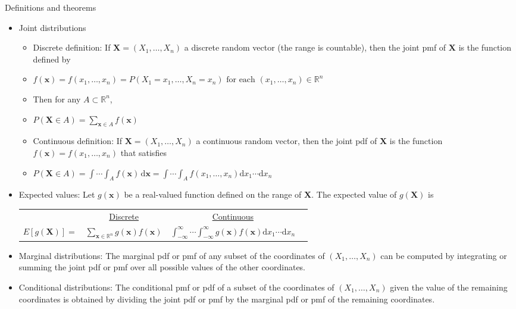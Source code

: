\documentclass{article}
\newcommand{\integral}[4]{\displaystyle \int_{#1}^{#2} #3 \,\mathrm{d} #4}		%
\newcommand{\vecn}[2]{#1_1, \ldots, #1_{#2}}	%
\begin{document}
Definitions and theorems
\begin{itemize}
    \item Joint distributions
    \begin{itemize}
        \item Discrete definition: If $\mathbf{X} = (\vecn{X}{n})$ a discrete random vector (the range is countable), then the joint pmf of $\mathbf{X}$ is the function defined by
        \item[] $f(\mathbf{x}) = f(\vecn{x}{n}) = P(X_1 = x_1, \ldots, X_n = x_n) \text{ for each } (\vecn{x}{n}) \in \mathbb{R}^n$
        \item[] Then for any $A \subset \mathbb{R}^n$,
        \item[] $\displaystyle P(\mathbf{X} \in A) = \sum_{\mathbf{x} \in A} f(\mathbf{x})$
        \item Continuous definition: If $\mathbf{X} = (\vecn{X}{n})$ a continuous random vector, then the joint pdf of $\mathbf{X}$ is the function $f(\mathbf{x}) = f(\vecn{x}{n})$ that satisfies
        \item[] $P(\mathbf{X} \in A) = \int \cdots \integral{A}{}{f(\mathbf{x})}{\mathbf{x}} = \int \cdots \int_A f(\vecn{x}{n}) \mathrm{d}x_1\cdots \mathrm{d}x_n$
    \end{itemize}
    \item Expected values: Let $g(\mathbf{x})$ be a real-valued function defined on the range of $\mathbf{X}$. The expected value of $g(\mathbf{X})$ is\\
    \begin{tabular}{c c c c}
        & \ul{Discrete} & \ul{Continuous}\\
        $E[g(\mathbf{X})] = $ & $\displaystyle \sum_{\mathbf{x} \in \mathbb{R}^n} g(\mathbf{x}) f(\mathbf{x})$ & $\displaystyle \int_{-\infty}^{\infty} \cdots \int_{-\infty}^{\infty} g(\mathbf{x}) f(\mathbf{x}) \mathrm{d}x_1\cdots \mathrm{d}x_n$\\
    \end{tabular}\bigskip
    \item Marginal distributions: The marginal pdf or pmf of any subset of the coordinates of $(\vecn{X}{n})$ can be computed by integrating or summing the joint pdf or pmf over all possible values of the other coordinates.
    \item Conditional distributions: The conditional pmf or pdf of a subset of the coordinates of $(\vecn{X}{n})$ given the value of the remaining coordinates is obtained by dividing the joint pdf or pmf by the marginal pdf or pmf of the remaining coordinates.
\end{itemize}\bigskip
\end{document}
